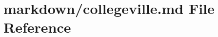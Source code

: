 \hypertarget{collegeville_8md}{}\section{markdown/collegeville.md File Reference}
\label{collegeville_8md}
